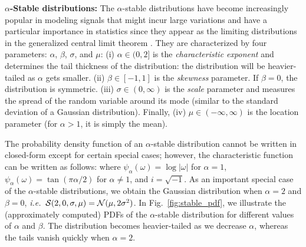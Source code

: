 

\textbf{$\alpha$-Stable distributions:} 
The $\alpha$-stable distributions have become increasingly popular in modeling signals that might incur large variations \citep{kuruoglu1999signal, mandelbrot2013fractals,simsekli2015alpha,wang2016delving,leglaive:hal-01416366} and have a particular importance in statistics since they appear as the limiting distributions in the generalized central limit theorem \citep{samorodnitsky1994stable}. They are characterized by four parameters: $\alpha$, $\beta$, $\sigma$, and $\mu$:
%
(i) $\alpha \in (0,2]$ is the \emph{characteristic exponent} and determines the tail thickness of the distribution: the distribution will be heavier-tailed as $\alpha$ gets smaller. 
(ii) $\beta \in [-1 ,1]$ is the \emph{skewness} parameter.
If $\beta = 0$, the distribution is symmetric.
(iii) $\sigma \in (0,\infty)$ is the \emph{scale} parameter and measures the spread of the random variable around its mode (similar to the standard deviation of a Gaussian distribution). Finally, (iv) $\mu \in (-\infty, \infty)$ is the location parameter (for $\alpha > 1$, it is simply the mean). 

The probability density function of an $\alpha$-stable distribution cannot be written in closed-form except for certain special cases; however, the characteristic function  can be written as follows:
where $\psi_\alpha(\omega) = \log |\omega| $ for $\alpha =1$, $\psi_\alpha(\omega) = \tan(\pi \alpha/2)$ for $\alpha \neq 1$, and $i = \sqrt{-1}$. 
%
As an important special case of the $\alpha$-stable distributions, we obtain the Gaussian distribution when $\alpha = 2$ and $\beta =0$, \textit{i.e.}\ ${\cal S}(2,0,\sigma,\mu) = {\cal N}(\mu,2 \sigma^2)$. 
%
In Fig.~\ref{fig:stable_pdf}, we illustrate the (approximately computed) \acp{PDF} of the $\alpha$-stable distribution for different values of $\alpha$ and $\beta$. The distribution becomes heavier-tailed as we decrease $\alpha$, whereas the tails vanish quickly when $\alpha=2$. 


